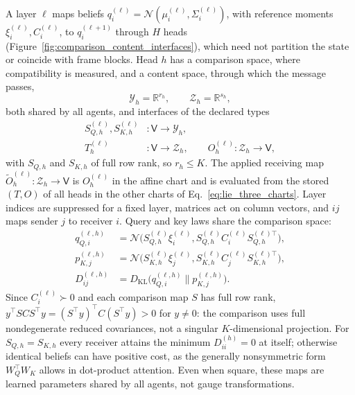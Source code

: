 \documentclass[twoside,11pt]{article}
\begin{document}
A layer \(\ell\) maps beliefs \(q_i^{(\ell)}=\mathcal N(\mu_i^{(\ell)},\Sigma_i^{(\ell)})\), with reference moments \(\xi_i^{(\ell)},C_i^{(\ell)}\), to \(q_i^{(\ell+1)}\) through \(H\) heads (Figure~\ref{fig:comparison_content_interfaces}), which need not partition the state or coincide with frame blocks. Head \(h\) has a comparison space, where compatibility is measured, and a content space, through which the message passes,
\begin{equation}
\mathcal Y_h=\mathbb R^{r_h},
\qquad
\mathcal Z_h=\mathbb R^{s_h},
\label{eq:head_channel_spaces}
\end{equation}
both shared by all agents, and interfaces of the declared types
\begin{align}
S_{Q,h}^{(\ell)},S_{K,h}^{(\ell)}
&:\mathsf V\longrightarrow\mathcal Y_h,\\
T_h^{(\ell)}&:\mathsf V\longrightarrow\mathcal Z_h,
\qquad
O_h^{(\ell)}:\mathcal Z_h\longrightarrow\mathsf V,
\label{eq:head_interface_types}
\end{align}
with \(S_{Q,h}\) and \(S_{K,h}\) of full row rank, so \(r_h\le K\). The applied receiving map \(\widetilde O_h^{(\ell)}:\mathcal Z_h\to\mathsf V\) is \(O_h^{(\ell)}\) in the affine chart and is evaluated from the stored \((T,O)\) of all heads in the other charts of Eq.~\eqref{eq:lie_three_charts}. Layer indices are suppressed for a fixed layer, matrices act on column vectors, and \(ij\) maps sender \(j\) to receiver \(i\). Query and key laws share the comparison space:
\begin{align}
q_{Q,i}^{(\ell,h)}
&=\mathcal N\bigl(S_{Q,h}^{(\ell)}\xi_i^{(\ell)},
 S_{Q,h}^{(\ell)}C_i^{(\ell)}S_{Q,h}^{(\ell)\top}\bigr),\label{eq:relational_query_law}\\
p_{K,j}^{(\ell,h)}
&=\mathcal N\bigl(S_{K,h}^{(\ell)}\xi_j^{(\ell)},
 S_{K,h}^{(\ell)}C_j^{(\ell)}S_{K,h}^{(\ell)\top}\bigr),\label{eq:relational_key_law}\\
D_{ij}^{(\ell,h)}
&=D_{\mathrm{KL}}\bigl(q_{Q,i}^{(\ell,h)}\|p_{K,j}^{(\ell,h)}\bigr).
\label{eq:relational_role_kl}
\end{align}
Since \(C_i^{(\ell)}\succ0\) and each comparison map \(S\) has full row rank, \(y^\top SCS^\top y=(S^\top y)^\top C(S^\top y)>0\) for \(y\ne0\): the comparison uses full nondegenerate reduced covariances, not a singular \(K\)-dimensional projection. For \(S_{Q,h}=S_{K,h}\) every receiver attains the minimum \(D_{ii}^{(h)}=0\) at itself; otherwise identical beliefs can have positive cost, as the generally nonsymmetric form \(W_Q^\top W_K\) allows in dot-product attention. Even when square, these maps are learned parameters shared by all agents, not gauge transformations.
\end{document}
